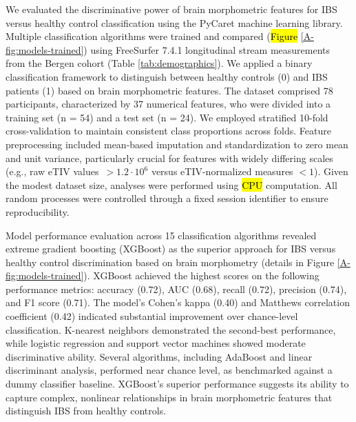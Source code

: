 \documentclass[diagnostics,article,accept,pdftex,moreauthors]{Definitions/mdpi}
\begin{document}
We evaluated the discriminative power of brain morphometric features for IBS versus healthy control classification using the {PyCaret}  machine learning library. Multiple classification algorithms were trained and compared (\hl{Figure} \ref{A-fig:models-trained}) %
using FreeSurfer 7.4.1 longitudinal stream measurements from the Bergen cohort (Table \ref{tab:demographics}). We applied a binary classification framework to distinguish between healthy controls (0) and IBS patients (1) based on brain morphometric features. The dataset comprised 78 participants, characterized by 37 numerical features, who were divided into a training set (n = 54) and a test set (n = 24). We employed stratified 10-fold cross-validation to maintain consistent class proportions across folds. Feature preprocessing included mean-based imputation and standardization to zero mean and unit variance, particularly crucial for features with widely differing scales (e.g., raw eTIV \mbox{values $>1.2 \cdot 10^6$} versus eTIV-normalized measures $<1$). Given the modest dataset size, analyses were performed using \hl{CPU} %
computation. All random processes were controlled through a fixed session identifier to ensure reproducibility.


Model performance evaluation across 15 classification algorithms revealed extreme gradient boosting (XGBoost) as the superior approach for IBS versus healthy control discrimination based on brain morphometry (details in Figure \ref{A-fig:models-trained}). XGBoost achieved the highest scores on the following performance metrics: accuracy (0.72), AUC (0.68), recall (0.72), precision (0.74), and F1 score (0.71). The model's Cohen's kappa (0.40) and Matthews correlation coefficient (0.42) indicated substantial improvement over chance-level classification. K-nearest neighbors demonstrated the second-best performance, while logistic regression and support vector machines showed moderate discriminative ability. Several algorithms, including AdaBoost and linear discriminant analysis, performed near chance level, as benchmarked against a dummy classifier baseline. XGBoost's superior performance suggests its ability to capture complex, nonlinear relationships in brain morphometric features that distinguish IBS from healthy controls.
\end{document}
